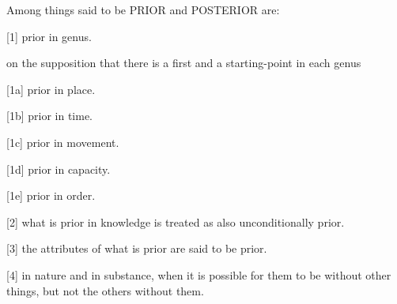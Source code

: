 Among things said to be PRIOR and POSTERIOR are:

[1]     prior in genus.
        
        on the supposition that there is
        a first and a starting-point in each genus     

[1a]    prior in place.

[1b]    prior in time.

[1c]    prior in movement.

[1d]    prior in capacity.

[1e]    prior in order.

[2]     what is prior in knowledge is treated as also unconditionally prior.

[3]     the attributes of what is prior are said to be prior.

[4]     in nature and in substance, when it is possible for them
        to be without other things, but not the others without them.

